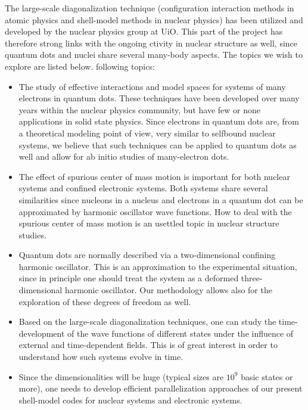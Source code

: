 The large-scale diagonalization technique 
(configuration interaction methods in atomic physics and shell-model methods
in nuclear physics) has been utilized and developed by the nuclear physics group at UiO. 
This part of the project has therefore 
strong links with the ongoing ctivity in nuclear structure as well, since quantum dots and nuclei share
several many-body aspects. The topics we wish to explore are listed below.
following topics:
\begin{itemize} 
\item The study of effective interactions  and model spaces for systems of many electrons in quantum dots.
These techniques have been developed over many years within the nuclear physics community, but have few or none
applications in solid state physics. Since electrons in quantum dots are, from a theoretical modeling point of
view, very similar to selfbound nuclear systems, we believe that such techniques can be 
applied to quantum dots as well
and allow for ab initio studies of many-electron dots.
\item The effect of spurious center of mass motion is important for both nuclear systems and confined electronic
systems. Both systems share several similarities 
since nucleons in a nucleus and electrons in a quantum dot can be approximated by harmonic
oscillator wave functions. How to deal with the spurious center of mass motion is an usettled topic in 
nuclear structure studies. 
\item Quantum dots are normally described via a two-dimensional confining harmonic oscillator. This is an 
approximation to the experimental situation, since in principle one should treat the system as a deformed
three-dimensional harmonic oscillator. Our methodology allows also for the exploration of these
degrees of freedom as well.
\item Based on the large-scale diagonalization techniques, one can study the time-development of the wave functions
of different states under the influence of external and time-dependent fields. This is of great interest in order to understand
how such systems evolve in time.
\item  Since the dimensionalities will be huge (typical sizes are $10^9$ basic states or more), one needs to develop 
efficient parallelization approaches  of our present shell-model codes for nuclear systems and electronic systems.
\end{itemize}

